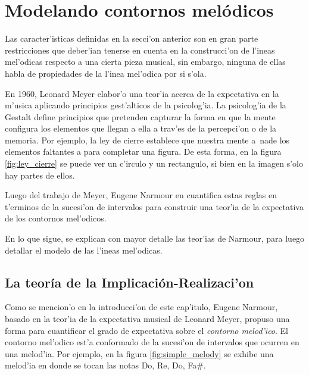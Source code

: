 \section{Modelando contornos mel\'odicos}
\label{sec:melodic_contour}
Las caracter'isticas definidas en la secci'on anterior son en gran parte restricciones que deber'ian tenerse en cuenta en la construcci'on 
de l'ineas mel'odicas respecto a una cierta pieza musical, sin embargo, ninguna de ellas habla de propiedades de la l'inea mel'odica 
por si s'ola.

En 1960, Leonard Meyer elabor'o una teor'ia acerca de la expectativa en la m'usica aplicando principios gest'alticos de la psicolog'ia. La 
psicolog'ia de la Gestalt define principios que pretenden capturar la forma en que la mente configura los elementos que llegan a ella a trav'es 
de la percepci'on o de la memoria. Por ejemplo, la ley de cierre establece que nuestra mente a~nade los elementos faltantes a para completar una 
figura. De esta forma, en la figura \ref{fig:ley_cierre} se puede ver un c'irculo y un rectangulo, si bien en la imagen s'olo hay partes de ellos.

\begin{imagen}
    \width{6cm}
\end{imagen}

Luego del trabajo de Meyer, Eugene Narmour en \citep{Narmour91} cuantifica estas reglas en t'erminos de la sucesi'on de intervalos para construir una teor'ia de 
la expectativa de los contornos mel'odicos. 

En lo que sigue, se explican con mayor detalle las teor'ias de Narmour, para luego detallar el modelo de las l'ineas mel'odicas.

\subsection{La teor\'ia de la Implicaci\'on-Realizaci'on}
Como se mencion'o en la introducci'on de este cap'itulo, Eugene Narmour, basado en la teor'ia de la expectativa musical de Leonard Meyer, propuso una forma para cuantificar
el grado de expectativa sobre el \emph{contorno melod'ico}. El contorno mel'odico est'a conformado de la sucesi'on de intervalos que ocurren en una melod'ia. Por ejemplo, 
en la figura \ref{fig:simple_melody} se exhibe una melod'ia en donde se tocan las notas Do, Re, Do, Fa\#. 

